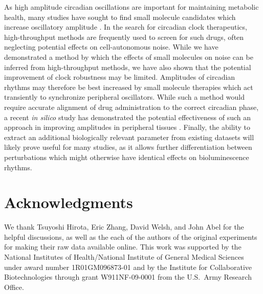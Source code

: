 \documentclass[11pt, letterpaper]{article}
\newcommand{\beginsupplement}{%
        \clearpage
        \setcounter{table}{0}
        \renewcommand{\thetable}{S\arabic{table}}%
        \setcounter{figure}{0}
        \renewcommand{\thefigure}{S\arabic{figure}}%
     }
\begin{document}
As high amplitude circadian oscillations are important for maintaining metabolic health, many studies have sought to find small molecule candidates which increase oscillatory amplitude \cite{Chen2013}.
In the search for circadian clock therapeutics, high-throughput methods are frequently used to screen for such drugs, often neglecting potential effects on cell-autonomous noise.
While we have demonstrated a method by which the effects of small molecules on noise can be inferred from high-throughput methods, we have also shown that the potential improvement of clock robustness may be limited.
Amplitudes of circadian rhythms may therefore be best increased by small molecule therapies which act transiently to synchronize peripheral oscillators.
While such a method would require accurate alignment of drug administration to the correct circadian phase, a recent {\itshape in silico} study has demonstrated the potential effectiveness of such an approach in improving amplitudes in peripheral tissues \cite{St.John2014a}.
Finally, the ability to extract an additional biologically relevant parameter from existing datasets will likely prove useful for many studies, as it allows further differentiation between perturbations which might otherwise have identical effects on bioluminescence rhythms.



\section*{Acknowledgments}
We thank Tsuyoshi Hirota, Eric Zhang, David Welsh, and John Abel for the helpful discussions, as well as the each of the authors of the original experiments for making their raw data available online.
This work was supported by the National Institutes of Health/National Institute of General Medical Sciences under award number 1R01GM096873-01 and by the Institute for Collaborative Biotechnologies through grant W911NF-09-0001 from the U.S.\ Army Research Office.





\beginsupplement
\end{document}
